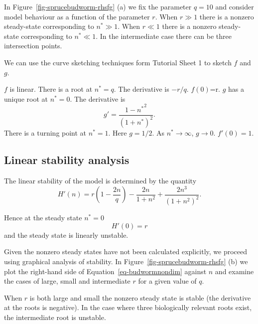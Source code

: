 \documentclass[
  letterpaper,
  DIV=11,
  numbers=noendperiod]{scrreprt}
\begin{document}
In Figure~\ref{fig-sprucebudworm-rhsfg} (a) we fix the parameter
\(q=10\) and consider model behaviour as a function of the parameter
\(r\). When \(r\gg1\) there is a nonzero steady-state corresponding to
\(n^*\gg 1\). When \(r\ll1\) there is a nonzero steady-state
corresponding to \(n^*\ll 1\). In the intermediate case there can be
three intersection points.

We can use the curve sketching techniques form Tutorial Sheet 1 to
sketch \(f\) and \(g\).

\(f\) is linear. There is a root at \(n^*=q\). The derivative is
\(-r/q\). \(f(0)\)=r. \(g\) has a unique root at \(n^*=0\). The
derivative is \[
g'=\frac{1-n{^*}^2}{(1+n^*)^2}.
\] There is a turning point at \(n^*=1\). Here \(g=1/2\). As
\(n^*\rightarrow \infty\), \(g\rightarrow 0\). \(f'(0)=1\).

\hypertarget{linear-stability-analysis-3}{%
\subsection{Linear stability
analysis}\label{linear-stability-analysis-3}}

The linear stability of the model is determined by the quantity \[
H'(n)=r(1-\frac{2n}{q})-\frac{2{n}}{1+{n}^2} +\frac{2{n}^3}{(1+{n}^2)^2}.
\]

Hence at the steady state \(n^*=0\) \[
H'(0)=r
\] and the steady state is linearly unstable.

Given the nonzero steady states have not been calculated explicitly, we
proceed using graphical analysis of stability. In
Figure~\ref{fig-sprucebudworm-rhsfg} (b) we plot the right-hand side of
Equation~\ref{eq-budwormnondim} against \(n\) and examine the cases of
large, small and intermediate \(r\) for a given value of \(q\).

When \(r\) is both large and small the nonzero steady state is stable
(the derivative at the roots is negative). In the case where three
biologically relevant roots exist, the intermediate root is unstable.
\end{document}
